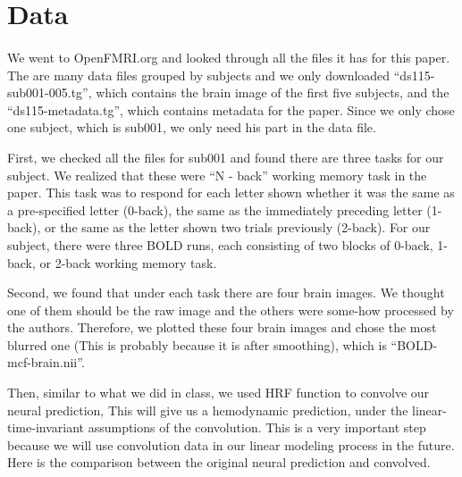 \documentclass[11pt]{article}
\begin{document}

\section{Data}
\paragraph{}
We went to OpenFMRI.org and looked through all the files it has for this paper. 
The are many data files grouped by subjects and we only downloaded 
``ds115-sub001-005.tg'', which contains the brain image of the first five 
subjects, and the ``ds115-metadata.tg'', which contains metadata for the paper.
Since we only chose one subject, which is sub001, we only need his part in the
data file.\par 
First, we checked all the files for sub001 and found there are three tasks for 
our subject. We realized that these were ``N - back'' working memory task in 
the paper. This task was to respond for each letter shown whether it was the 
same as a pre-specified letter (0-back), the same as the immediately preceding 
letter (1-back), or the same as the letter shown two trials previously (2-back).
For our subject, there were three BOLD runs, each consisting of two blocks of 
0-back, 1-back, or 2-back working memory task. \par
Second, we found that under each task there are four brain images. We thought 
one of them should be the raw image and the others were some-how processed by 
the authors. Therefore, we plotted these four brain images and chose the most 
blurred one (This is probably because it is after smoothing), which is
``BOLD-mcf-brain.nii''.\par
Then, similar to what we did in class, we used HRF function to convolve our 
neural prediction, This will give us a hemodynamic prediction, under the 
linear-time-invariant assumptions of the convolution. This is a very important 
step because we will use convolution data in our linear modeling process in the
future. Here is the comparison between the original neural prediction and 
convolved.
\end{document}
